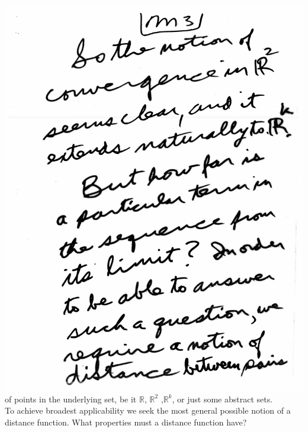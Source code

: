 \documentclass[10pt,a4paper]{article}
\begin{document}
{{\\\includegraphics[scale=0.5]{Pages/MetricSpace1_3.pdf}
\pagebreak
\\of points in the underlying set, be it $\mathbb{R}$, $\mathbb{R} ^{2}$ ,$\mathbb{R} ^{k}$, or just some abstract sets. 
\\To achieve broadest applicability we seek the most general possible notion of a distance function. What properties must a distance function have?
}}
\end{document}
